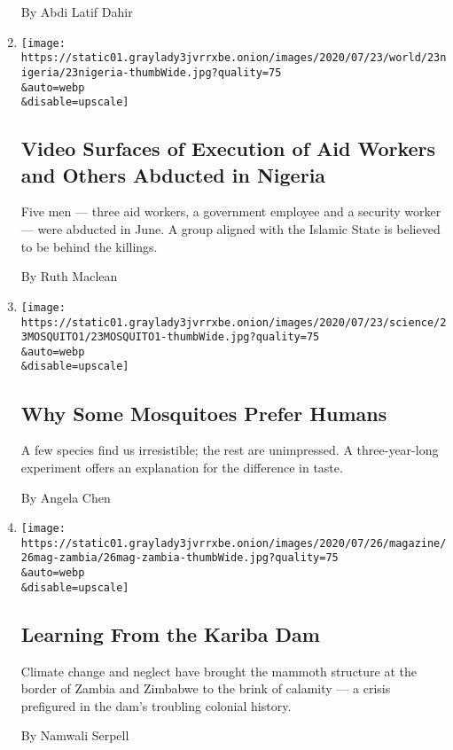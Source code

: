 \begin{enumerate}
  By Abdi Latif Dahir
\item
  \href{/2020/07/23/world/africa/aid-workers-executed-nigeria.html}{}

  \texttt{[image: https://static01.graylady3jvrrxbe.onion/images/2020/07/23/world/23nigeria/23nigeria-thumbWide.jpg?quality=75\\\&auto=webp\\\&disable=upscale]}

  \hypertarget{video-surfaces-of-execution-of-aid-workers-and-others-abducted-in-nigeria}{%
  \subsection{Video Surfaces of Execution of Aid Workers and Others
  Abducted in
  Nigeria}\label{video-surfaces-of-execution-of-aid-workers-and-others-abducted-in-nigeria}}

  Five men --- three aid workers, a government employee and a security
  worker --- were abducted in June. A group aligned with the Islamic
  State is believed to be behind the killings.

  By Ruth Maclean
\item
  \href{/2020/07/23/science/mosquitoes-genetics-africa.html}{}

  \texttt{[image: https://static01.graylady3jvrrxbe.onion/images/2020/07/23/science/23MOSQUITO1/23MOSQUITO1-thumbWide.jpg?quality=75\\\&auto=webp\\\&disable=upscale]}

  \hypertarget{why-some-mosquitoes-prefer-humans}{%
  \subsection{Why Some Mosquitoes Prefer
  Humans}\label{why-some-mosquitoes-prefer-humans}}

  A few species find us irresistible; the rest are unimpressed. A
  three-year-long experiment offers an explanation for the difference in
  taste.

  By Angela Chen
\item
  \href{/interactive/2020/07/22/magazine/zambia-kariba-dam.html}{}

  \texttt{[image: https://static01.graylady3jvrrxbe.onion/images/2020/07/26/magazine/26mag-zambia/26mag-zambia-thumbWide.jpg?quality=75\\\&auto=webp\\\&disable=upscale]}

  \hypertarget{learning-from-the-kariba-dam}{%
  \subsection{Learning From the Kariba
  Dam}\label{learning-from-the-kariba-dam}}

  Climate change and neglect have brought the mammoth structure at the
  border of Zambia and Zimbabwe to the brink of calamity --- a crisis
  prefigured in the dam's troubling colonial history.

  By Namwali Serpell
\end{enumerate}

